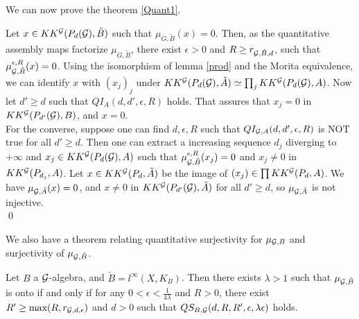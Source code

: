 We can now prove the theorem \ref{Quant1}.\\

\begin{dem}
Let $x\in KK^\mathcal G(P_d(\mathcal G),\tilde B)$ such that $\mu_{G,\tilde B}(x)=0$. Then, as the quantitative assembly maps factorize $\mu_{G,\tilde B}$, there exist $\epsilon>0$ and $R\geq r_{\mathcal G,\tilde B,d}$, such that $\mu_{\mathcal G,\tilde B}^{\epsilon,R}(x)=0$. Using the isomorphism of lemma \ref{prod} and the Morita equivalence, we can identify $x$ with $(x_j)_j$ under $KK^\mathcal G(P_d(\mathcal G),\tilde A)\simeq\prod_j KK^\mathcal G(P_d(\mathcal G),A)$. Now let $d'\geq d$ such that $QI_{A}(d,d',\epsilon,R)$ holds. That assures that $x_j=0$ in $KK^\mathcal G(P_{d'}(\mathcal G),B)$, and $x=0$.\\

For the converse, suppose one can find $d,\epsilon,R$ such that $QI_{\mathcal G,A}(d,d',\epsilon,R)$ is NOT true for all $d'\geq d$. Then one can extract a increasing sequence $d_j$ diverging to $+\infty$ and $x_j\in KK^\mathcal G(P_d(\mathcal G),A)$ such that $\mu_{\mathcal G,\tilde B}^{\epsilon,R}(x_j)=0$ and $x_j\neq 0$ in $KK^\mathcal G(P_{d_j},A)$. Let $x\in KK^\mathcal G(P_d,\tilde A)$ be the image of $(x_j)\in \prod KK^\mathcal G(P_d,A)$. We have $\mu_{\mathcal G,\tilde A}(x)=0$, and $x\neq 0$ in $KK^\mathcal G(P_{d'}(\mathcal G),\tilde A)$ for all $d'\geq d$, so $\mu_{\mathcal G,\tilde A}$ is not injective. \\
\qed   
\end{dem}

We also have a theorem relating quantitative surjectivity for $\mu_{\mathcal G,B}$ and surjectivity of $\mu_{\mathcal G,\tilde B}$.

\begin{thm}
Let $B$ a $\mathcal G$-algebra, and $\tilde B = l^\infty(X,K_B)$. Then there exists $\lambda>1$ such that $\mu_{\mathcal G,\tilde B}$ is onto if and only if for any $0<\epsilon<\frac{1}{4\lambda}$ and $R>0$, there exist $R'\geq \max(R,r_{\mathcal G,d,\epsilon})$ and $d>0$ such that $QS_{B,\mathcal G}(d,R,R',\epsilon,\lambda\epsilon)$ holds.
\end{thm}

